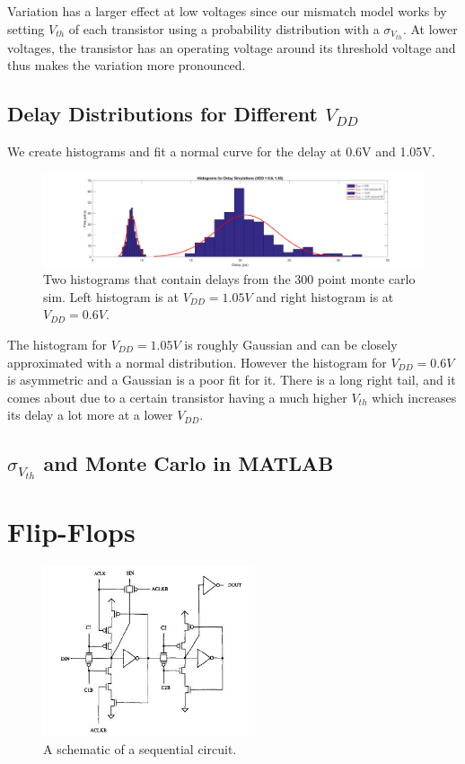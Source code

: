 \documentclass[11pt]{article}
\begin{document}
Variation has a larger effect at low voltages since our mismatch model works by setting $V_{th}$ of each transistor using a probability distribution with a $\sigma_{V_{th}}$. At lower voltages, the transistor has an operating voltage around its threshold voltage and thus makes the variation more pronounced.

\subsection{Delay Distributions for Different $V_{DD}$}
We create histograms and fit a normal curve for the delay at 0.6V and 1.05V. 

\begin{figure}[H]
	\centerline{\includegraphics[width=\textwidth+4cm]{delay_histograms.png}}
	\caption{Two histograms that contain delays from the 300 point monte carlo sim. Left histogram is at $V_{DD} = 1.05V$ and right histogram is at $V_{DD} = 0.6V$.}
\end{figure}

The histogram for $V_{DD} = 1.05V$ is roughly Gaussian and can be closely approximated with a normal distribution. However the histogram for $V_{DD} = 0.6V$ is asymmetric and a Gaussian is a poor fit for it. There is a long right tail, and it comes about due to a certain transistor having a much higher $V_{th}$ which increases its delay a lot more at a lower $V_{DD}$.

\subsection{$\sigma_{V_{th}}$ and Monte Carlo in MATLAB}


\section{Flip-Flops}
\begin{figure}[H]
	\centerline{\includegraphics[height=5cm]{flip_flop_schematic.jpg}}
	\caption{A schematic of a sequential circuit.}
\end{figure}
\end{document}
